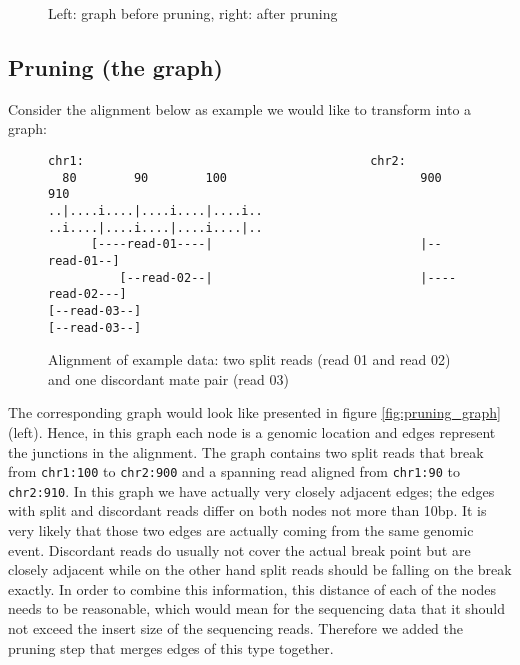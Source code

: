 \documentclass{article}
\theoremstyle{definition}
\begin{document}
\begin{figure}
\begin{center}
\caption{Left: graph before pruning, right: after pruning}
\label{fig:edges_clips}
\end{center}
\end{figure}

\subsection{Pruning (the graph)}
Consider the alignment below as example we would like to transform into a graph:
\begin{figure}
\begin{verbatim}
chr1:                                        chr2:
  80        90        100                           900       910
..|....i....|....i....|....i..               ..i....|....i....|....i....|..
      [----read-01----|                             |--read-01--]
          [--read-02--|                             |----read-02---]
[--read-03--]                                                [--read-03--]
\end{verbatim}
\caption{Alignment of example data: two split reads (read 01 and read 02) and one discordant mate pair (read 03)}
\label{fig:pruning_alignment}
\end{figure}
The corresponding graph would look like presented in figure \ref{fig:pruning_graph} (left).
Hence, in this graph each node is a genomic location and edges represent the junctions in the alignment.
The graph contains two split reads that break from \verb|chr1:100| to \verb|chr2:900| and a spanning read aligned from \verb|chr1:90| to \verb|chr2:910|.
In this graph we have actually very closely adjacent edges; the edges with split and discordant reads differ on both nodes not more than 10bp.
It is very likely that those two edges are actually coming from the same genomic event.
Discordant reads do usually not cover the actual break point but are closely adjacent while on the other hand split reads should be falling on the break exactly.
In order to combine this information, this distance of each of the nodes needs to be reasonable, which would mean for the sequencing data that it should not exceed the insert size of the sequencing reads.
Therefore we added the pruning step that merges edges of this type together.
\end{document}
